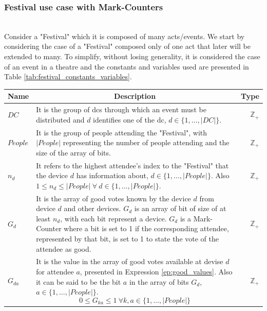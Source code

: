 \subsubsection{Festival use case with Mark-Counters} \\
Consider a "Festival" which it is composed of many acts/events. We start by considering the case of a "Festival" composed only of one act that later will be extended to many. To simplify, without losing generality, it is considered the case of an event in a theatre and the constants and variables used are presented in Table \ref{tab:festival_constants_variables}.
\begin{table}[!ht]
	\begin{tabular}{|p{2.4cm}|p{13.4cm}|r| }
		\hline
		\multicolumn{1}{|c|}{Name} & \multicolumn{1}{c|}{Description} & \multicolumn{1}{c|}{Type} \\
		\hline
		\hline
			$DC$ & It is the group of \glspl{dc} through which an event must be distributed and $d$ identifies one of the \gls{dc}, $d \in \{1,\dots, |DC|\}$. & $\mathbb{Z}_{+}$ \\
		\hline
			$People$ & It is the group of people attending the "Festival", with $|People|$ representing the number of people attending and the size of the array of bits. & $\mathbb{Z}_{+}$ \\
		\hline
			$n_{d}$ & It refers to the highest attendee's index to the "Festival" that the device $d$ has information about,  $d \in \{1,\dots, |People|\}$. Also $1 \le n_{d} \le |People| ~ \forall ~ d \in \{1,\dots, |People|\}$. & $\mathbb{Z}_{+}$ \\
		\hline
			$G_{d}$ & It is the array of good votes known by the device $d$ from device $d$ and other devices. $G_{d}$ is an array of bit of size of at least $n_{d}$, with each bit represent a device. $G_{d}$ is a Mark-Counter where a bit is set to 1 if the corresponding attendee, represented by that bit, is set to 1 to state the vote of the attendee as good. & $\mathbb{Z}_{+}$ \\
		\hline 
			$G_{da}$ & It is the value in the array of good votes available at devise $d$ for attendee $a$, presented in Expression \ref{ep:good_values}. Also it can be said to be the bit $a$ in the array of bits $G_{d}$, $a \in \{1,\dots, |People|\}$.
				\begin{equation} \label{ep:good_values}
					0 \le G_{ka} \le 1 ~ \forall k,a \in \{1,\dots, |People|\}
				\end{equation} & 
			$\mathbb{Z}_{+}$ \\

\end{tabular}
\end{table}
